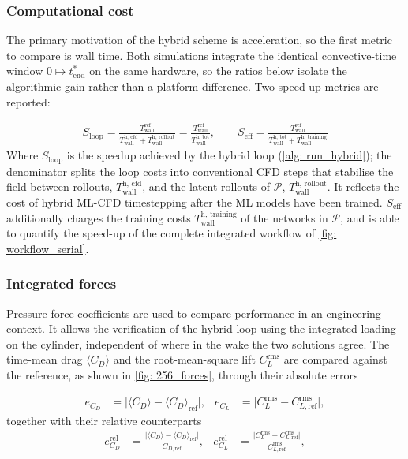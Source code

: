 \subsubsection{Computational cost}
The primary motivation of the hybrid scheme is acceleration, so the first metric to compare is wall time. Both simulations integrate the identical convective-time window $0 \mapsto t^*_\text{end}$ on the same hardware, so the ratios below isolate the algorithmic gain rather than a platform difference. Two speed-up metrics are reported:

\begin{align}
  S_\text{loop} = \frac{T_\text{wall}^\text{ref}}{T_\text{wall}^\text{h, cfd} + T_\text{wall}^\text{h, rollout}} = \frac{T_\text{wall}^\text{ref}}{T_\text{wall}^\text{h, tot}},
  \qquad
  S_\text{eff}
  = \frac{T_\text{wall}^\text{ref}}{T_\text{wall}^\text{h, tot} + T_\text{wall}^\text{h, training}}
\end{align}
Where $S_\text{loop}$ is the speedup achieved by the hybrid loop (\autoref{alg: run_hybrid}); the denominator splits the loop costs into conventional CFD steps that stabilise the field between rollouts, $T_\text{wall}^\text{h, cfd}$, and the latent rollouts of $\mathcal{P}$, $T_\text{wall}^\text{h, rollout}$. It reflects the cost of hybrid ML-CFD timestepping after the ML models have been trained. $S_\text{eff}$ additionally charges the training costs $T_\text{wall}^\text{h, training}$ of the networks in $\mathcal{P}$, and is able to quantify the speed-up of the complete integrated workflow of \autoref{fig: workflow_serial}. 

\subsubsection{Integrated forces}

Pressure force coefficients are used to compare performance in an engineering context. It allows the verification of the hybrid loop using the integrated loading on the cylinder, independent of where in the wake the two solutions agree. The time-mean drag $\langle C_D \rangle$ and the root-mean-square lift $C_L^\text{rms}$ are compared against the reference, as shown in \autoref{fig: 256_forces}, through their absolute errors

\begin{align}
  e_{C_D} &= \bigl| \langle C_D \rangle - \langle C_D \rangle_\text{ref} \bigr|,
  &
  e_{C_L} &= \bigl| C_L^\text{rms} - C_{L,\text{ref}}^\text{rms} \bigr|,
\end{align}
together with their relative counterparts 
\begin{align}
  e^\text{rel}_{C_D} &= \frac{\bigl| \langle C_D \rangle - \langle C_D \rangle_\text{ref} \bigr|}{C_{D, \text{ref}}},
  &
  e^\text{rel}_{C_L} &= \frac{\bigl| C_L^\text{rms} - C_{L,\text{ref}}^\text{rms} \bigr|}{C_{L,\text{ref}}^\text{rms}},
\end{align}

